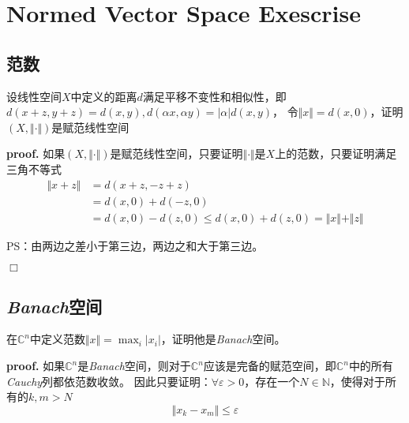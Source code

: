 \chapter{Normed Vector Space Exescrise}

\section{范数}

\begin{mdframed}
    \begin{question}
        设线性空间$X$中定义的距离$d$满足平移不变性和相似性，即$d(x+z,y+z)=d(x,y),d(\alpha x,\alpha y)=|\alpha|d(x,y)$，
        令$\Vert x\Vert=d(x,0)$，证明$(X,\Vert \cdot\Vert)$是赋范线性空间
    \end{question}
\end{mdframed}

\textbf{proof.} 如果$(X,\Vert\cdot\Vert)$是赋范线性空间，只要证明$\Vert\cdot\Vert$是$X$上的范数，只要证明满足三角不等式
\begin{equation}
    \begin{aligned}
        \Vert x+z\Vert&=d(x+z,-z+z)\\
        &=d(x,0)+d(-z,0)\\
        &=d(x,0)-d(z,0)\leqslant d(x,0)+d(z,0)=\Vert x\Vert+\Vert z\Vert
    \end{aligned} 
\end{equation}

PS：由两边之差小于第三边，两边之和大于第三边。

$\Box$

\section{\textsl{Banach}空间}

\begin{mdframed}
    \begin{question}
        在$\mathbb{C}^n$中定义范数$\Vert x\Vert=\max_{i}|x_i|$，证明他是\textsl{Banach}空间。
    \end{question}
\end{mdframed}

\textbf{proof.} 如果$\mathbb{C}^n$是\textsl{Banach}空间，则对于$\mathbb{C}^n$应该是完备的赋范空间，即$\mathbb{C}^n$中的所有\textsl{Cauchy}列都依范数收敛。
因此只要证明：$\forall \varepsilon>0$，存在一个$N\in \mathbb{N}$，使得对于所有的$k,m>N$
\begin{equation}
    \Vert x_k-x_m\Vert\leqslant \varepsilon
\end{equation}


